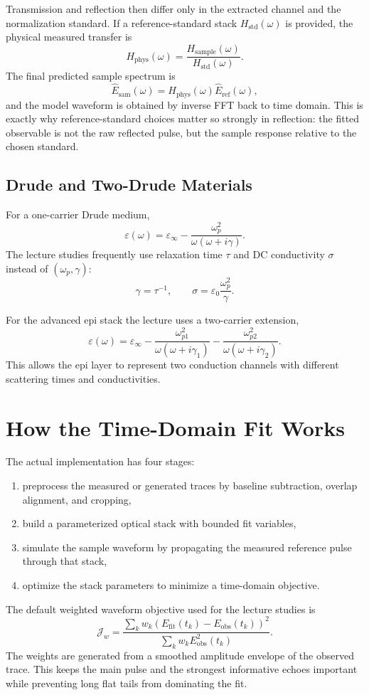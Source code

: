 \documentclass[11pt]{article}
\begin{document}
Transmission and reflection then differ only in the extracted channel and the normalization standard. If a reference-standard stack $H_{\mathrm{std}}(\omega)$ is provided, the physical measured transfer is
\[
H_{\mathrm{phys}}(\omega)=\frac{H_{\mathrm{sample}}(\omega)}{H_{\mathrm{std}}(\omega)}.
\]
The final predicted sample spectrum is
\[
\hat{E}_{\mathrm{sam}}(\omega)=H_{\mathrm{phys}}(\omega)\hat{E}_{\mathrm{ref}}(\omega),
\]
and the model waveform is obtained by inverse FFT back to time domain. This is exactly why reference-standard choices matter so strongly in reflection: the fitted observable is not the raw reflected pulse, but the sample response relative to the chosen standard.

\subsection{Drude and Two-Drude Materials}
For a one-carrier Drude medium,
\[
\varepsilon(\omega)=\varepsilon_\infty-\frac{\omega_p^2}{\omega(\omega+i\gamma)}.
\]
The lecture studies frequently use relaxation time $\tau$ and DC conductivity $\sigma$ instead of $(\omega_p,\gamma)$:
\[
\gamma = \tau^{-1}, \qquad \sigma=\varepsilon_0\frac{\omega_p^2}{\gamma}.
\]

For the advanced epi stack the lecture uses a two-carrier extension,
\[
\varepsilon(\omega)=\varepsilon_\infty
-\frac{\omega_{p1}^2}{\omega(\omega+i\gamma_1)}
-\frac{\omega_{p2}^2}{\omega(\omega+i\gamma_2)}.
\]
This allows the epi layer to represent two conduction channels with different scattering times and conductivities.

\section{How the Time-Domain Fit Works}
The actual implementation has four stages:
\begin{enumerate}[leftmargin=2em]
\item preprocess the measured or generated traces by baseline subtraction, overlap alignment, and cropping,
\item build a parameterized optical stack with bounded fit variables,
\item simulate the sample waveform by propagating the measured reference pulse through that stack,
\item optimize the stack parameters to minimize a time-domain objective.
\end{enumerate}

The default weighted waveform objective used for the lecture studies is
\[
\mathcal{J}_{w}=\frac{\sum_k w_k\left(E_{\mathrm{fit}}(t_k)-E_{\mathrm{obs}}(t_k)\right)^2}{\sum_k w_k E_{\mathrm{obs}}^2(t_k)}.
\]
The weights are generated from a smoothed amplitude envelope of the observed trace. This keeps the main pulse and the strongest informative echoes important while preventing long flat tails from dominating the fit.
\end{document}
